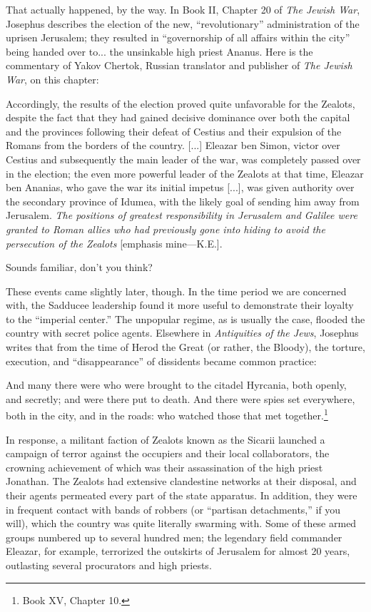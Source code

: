 That actually happened, by the way. In Book II, Chapter 20 of \emph{The Jewish War}, Josephus describes the election of the new, ``revolutionary'' administration of the uprisen Jerusalem; they resulted in ``governorship of all affairs within the city'' being handed over to... the unsinkable high priest Ananus. Here is the commentary of Yakov Chertok, Russian translator and publisher of \emph{The Jewish War}, on this chapter:

\begin{smallquote}
    Accordingly, the results of the election proved quite unfavorable for the Zealots, despite the fact that they had gained decisive dominance over both the capital and the provinces following their defeat of Cestius and their expulsion of the Romans from the borders of the country. [...] Eleazar ben Simon, victor over Cestius and subsequently the main leader of the war, was completely passed over in the election; the even more powerful leader of the Zealots at that time, Eleazar ben Ananias, who gave the war its initial impetus [...], was given authority over the secondary province of Idumea, with the likely goal of sending him away from Jerusalem. \emph{The positions of greatest responsibility in Jerusalem and Galilee were granted to Roman allies who had previously gone into hiding to avoid the persecution of the Zealots} [emphasis mine---K.E.].
\end{smallquote}
Sounds familiar, don't you think?

These events came slightly later, though. In the time period we are concerned with, the Sadducee leadership found it more useful to demonstrate their loyalty to the ``imperial center.'' The unpopular regime, as is usually the case, flooded the country with secret police agents. Elsewhere in \emph{Antiquities of the Jews}, Josephus writes that from the time of Herod the Great (or rather, the Bloody), the torture, execution, and ``disappearance'' of dissidents became common practice:

\begin{smallquote}
    And many there were who were brought to the citadel Hyrcania, both openly, and secretly; and were there put to death. And there were spies set everywhere, both in the city, and in the roads: who watched those that met together.\footnote{Book XV, Chapter 10.}
\end{smallquote}

In response, a militant faction of Zealots known as the Sicarii launched a campaign of terror against the occupiers and their local collaborators, the crowning achievement of which was their assassination of the high priest Jonathan. The Zealots had extensive clandestine networks at their disposal, and their agents permeated every part of the state apparatus. In addition, they were in frequent contact with bands of robbers (or ``partisan detachments,'' if you will), which the country was quite literally swarming with. Some of these armed groups numbered up to several hundred men; the legendary field commander Eleazar, for example, terrorized the outskirts of Jerusalem for almost 20 years, outlasting several procurators and high priests.

